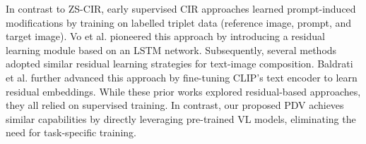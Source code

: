 In contrast to ZS-CIR, early supervised CIR approaches learned prompt-induced modifications by training on labelled triplet data (reference image, prompt, and target image). Vo et al. \cite{vo2019composing} pioneered this approach by introducing a residual learning module based on an LSTM network. Subsequently, several methods \cite{chen2020learning,wu2021fashion,yu2020curlingnet} adopted similar residual learning strategies for text-image composition. Baldrati et al. \cite{baldrati2022conditioned} further advanced this approach by fine-tuning CLIP's text encoder to learn residual embeddings.
While these prior works explored residual-based approaches, they all relied on supervised training. In contrast, our proposed PDV achieves similar capabilities by directly leveraging pre-trained VL models, eliminating the need for task-specific training.







